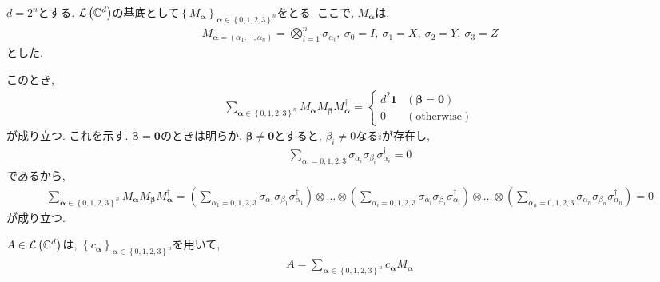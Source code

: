 \begin{ex}
    \label{ex8.19}
    $d = 2^n$とする. $\mathcal{L}\left({\mathbb{C}^d}\right)$の基底として$\left\{M_{\bm{\alpha}}\right\}_{\bm{\alpha}\in\left\{0,1,2,3\right\}^n}$をとる. ここで, $M_{\bm{\alpha}}$は,
    \begin{align*}
        M_{\bm{\alpha} = \left( \alpha_1, \cdots, \alpha_n \right)} = \bigotimes_{i=1}^n \sigma_{\alpha_i},\
        \sigma_0 = I, \ \sigma_1 = X, \ \sigma_2 = Y,\ \sigma_3 = Z
    \end{align*}
    とした.
    \par
    このとき,
    \begin{align*}
        \sum_{\bm{\alpha} \in \left\{0,1,2,3\right\}^n}
        M_{\bm{\alpha}} M_{\bm{\beta}} M_{\bm{\alpha}}^\dagger
        =
        \begin{cases}
            d^2 \mathbf{1} & \left(\bm{\beta} = \bm{0}\right) \\
            0              & \left( \text{otherwise}\right)
        \end{cases}
        \tag{$\star$}
    \end{align*}
    が成り立つ. これを示す. $\bm{\beta} = \bm{0}$のときは明らか. $\bm{\beta} \neq \bm{0}$とすると, $\beta_i \neq 0 $なる$i$が存在し,
    \begin{align*}
        \sum_{\alpha_i = 0,1,2,3}
        \sigma_{\alpha_i} \sigma_{\beta_i}  \sigma_{\alpha_i}^\dagger
        =
        0
    \end{align*}
    であるから,
    \begin{align*}
        \sum_{\bm{\alpha} \in \left\{0,1,2,3\right\}^n}
        M_{\bm{\alpha}} M_{\bm{\beta}} M_{\bm{\alpha}}^\dagger
        =
        \left(
        \sum_{\alpha_1 = 0,1,2,3}
        \sigma_{\alpha_1} \sigma_{\beta_1}  \sigma_{\alpha_1}^\dagger
        \right)
        \otimes
        \dots
        \otimes
        \left(
        \sum_{\alpha_i = 0,1,2,3}
        \sigma_{\alpha_i} \sigma_{\beta_i}  \sigma_{\alpha_i}^\dagger
        \right)
        \otimes
        \dots
        \otimes
        \left(
        \sum_{\alpha_n = 0,1,2,3}
        \sigma_{\alpha_n} \sigma_{\beta_n}  \sigma_{\alpha_n}^\dagger
        \right)
        =
        0
    \end{align*}
    が成り立つ.
    \par
    $A \in \mathcal{L}\left({\mathbb{C}^d}\right)$は, $\left\{c_{\bm{\alpha}}\right\}_{\bm{\alpha} \in \left\{0,1,2,3\right\}^n}$を用いて,
    \begin{align*}
        A = \sum_{\bm{\alpha} \in \left\{0,1,2,3\right\}^n} c_{\bm{\alpha}} M_{\bm{\alpha}}

\end{align*}
\end{ex}
